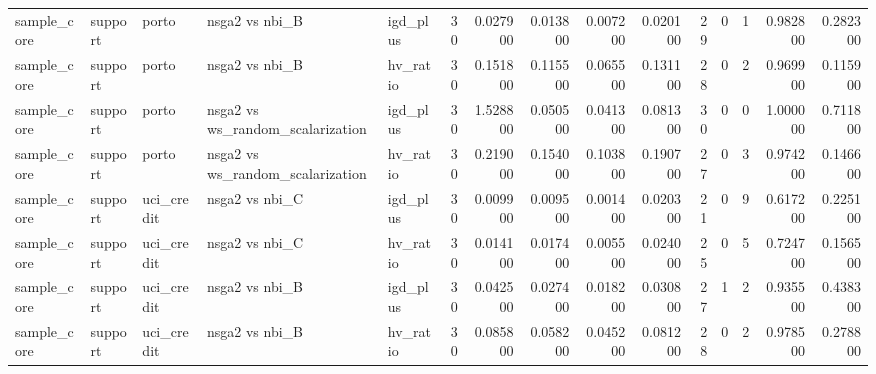 \begin{landscape}
\begin{longtable}{lllllrrrrrrrrrr}
sample\_core & support & porto & nsga2 vs nbi\_B & igd\_plus & 30 & 0.027900 & 0.013800 & 0.007200 & 0.020100 & 29 & 0 & 1 & 0.982800 & 0.282300 \\
sample\_core & support & porto & nsga2 vs nbi\_B & hv\_ratio & 30 & 0.151800 & 0.115500 & 0.065500 & 0.131100 & 28 & 0 & 2 & 0.969900 & 0.115900 \\
sample\_core & support & porto & nsga2 vs ws\_random\_scalarization & igd\_plus & 30 & 1.528800 & 0.050500 & 0.041300 & 0.081300 & 30 & 0 & 0 & 1.000000 & 0.711800 \\
sample\_core & support & porto & nsga2 vs ws\_random\_scalarization & hv\_ratio & 30 & 0.219000 & 0.154000 & 0.103800 & 0.190700 & 27 & 0 & 3 & 0.974200 & 0.146600 \\
sample\_core & support & uci\_credit & nsga2 vs nbi\_C & igd\_plus & 30 & 0.009900 & 0.009500 & 0.001400 & 0.020300 & 21 & 0 & 9 & 0.617200 & 0.225100 \\
sample\_core & support & uci\_credit & nsga2 vs nbi\_C & hv\_ratio & 30 & 0.014100 & 0.017400 & 0.005500 & 0.024000 & 25 & 0 & 5 & 0.724700 & 0.156500 \\
sample\_core & support & uci\_credit & nsga2 vs nbi\_B & igd\_plus & 30 & 0.042500 & 0.027400 & 0.018200 & 0.030800 & 27 & 1 & 2 & 0.935500 & 0.438300 \\
sample\_core & support & uci\_credit & nsga2 vs nbi\_B & hv\_ratio & 30 & 0.085800 & 0.058200 & 0.045200 & 0.081200 & 28 & 0 & 2 & 0.978500 & 0.278800 \\
\end{longtable}\endgroup\addtocounter{table}{-1}

\end{landscape}
